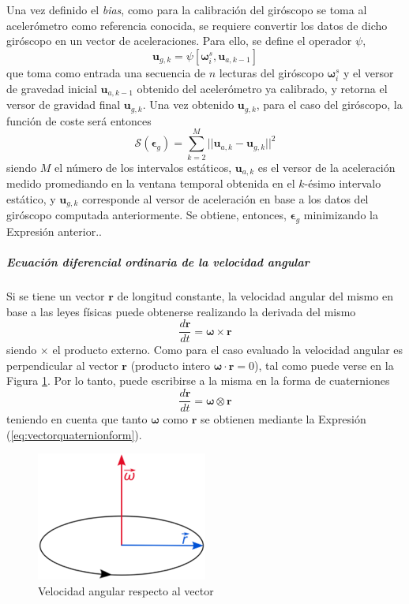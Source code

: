 Una vez definido el \textit{bias}, como para la calibración del giróscopo se toma al acelerómetro como referencia conocida, se requiere convertir los datos de dicho giróscopo en un vector de aceleraciones. Para ello, se define el operador $\psi$, 
\begin{equation}
    \bm{u}_{g,k} = \psi\left[\bm{\omega}_i^s,\bm{u}_{a,k-1}\right]
\end{equation}
que toma como entrada una secuencia de $n$ lecturas del giróscopo $\bm{\omega}_i^s$ y el versor de gravedad inicial $\bm{u}_{a,k-1}$ obtenido del acelerómetro ya calibrado, y retorna el versor de gravidad final $\bm{u}_{g,k}$. 
Una vez obtenido $\bm{u}_{g,k}$, para el caso del giróscopo, la función de coste será entonces
\begin{equation}
    \mathscr{S}(\bm{\epsilon}_{g}) = \sum_{k=2}^M ||\bm{u}_{a,k} - \bm{u}_{g,k}||^2
\end{equation}
siendo $M$ el número de los intervalos estáticos, $\bm{u}_{a,k}$ es el versor de la aceleración medido promediando en la ventana temporal obtenida en el $k$-ésimo intervalo estático, y $\bm{u}_{g,k}$ corresponde al versor de aceleración en base a los datos del giróscopo computada anteriormente. Se obtiene, entonces, $\bm{\epsilon}_{g}$ minimizando la Expresión anterior..

\subparagraph{Ecuación diferencial ordinaria de la velocidad angular}
Si se tiene un vector $\bm{r}$ de longitud constante, la velocidad angular del mismo en base a las leyes físicas puede obtenerse realizando la derivada del mismo
\begin{equation}
    \frac{d\bm{r}}{dt} = \bm{\omega}\times \bm{r}
\end{equation}
siendo $\times$ el producto externo. Como para el caso evaluado la velocidad angular es perpendicular al vector $\bm{r}$ (producto intero $\bm{\omega}\cdot\bm{r} = 0$), tal como puede verse en la Figura \ref{fig:angularvelocity}. Por lo tanto, puede escribirse a la misma en la forma de cuaterniones
\begin{equation}
    \frac{d\bm{r}}{dt} = \bm{\omega} \otimes \bm{r}
\end{equation}
teniendo en cuenta que tanto $\bm{\omega}$ como $\bm{r}$ se obtienen mediante la Expresión (\ref{eq:vectorquaternionform}).

\begin{figure}[!ht]
    \centering
    \includegraphics[width=0.5\textwidth]{Img/AngularVelocity.png}
    \caption{Velocidad angular respecto al vector}
    \label{fig:angularvelocity}
\end{figure}

